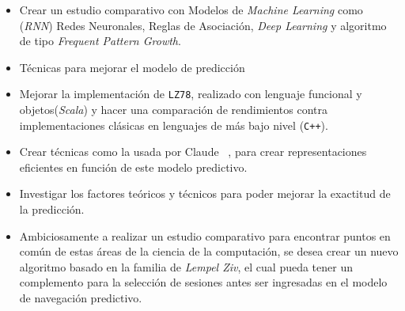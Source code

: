 \begin{itemize}

\item Crear un estudio comparativo con Modelos de \emph{Machine Learning} como (\emph{RNN}) Redes Neuronales, Reglas de Asociación, \emph{Deep Learning} y algoritmo de tipo \emph{Frequent Pattern Growth}.

\item Técnicas para mejorar el modelo de predicción 
\item Mejorar la implementación de \texttt{LZ78}, realizado con lenguaje funcional y objetos(\emph{Scala}) y hacer una comparación de rendimientos contra implementaciones clásicas en lenguajes de más bajo nivel (\texttt{C++}).


\item Crear técnicas como la usada por Claude \etal~\cite{Claude2014}, para crear representaciones eficientes en función de este modelo predictivo.


\item Investigar los factores teóricos y técnicos para poder mejorar la exactitud de la predicción.

\item Ambiciosamente a realizar un estudio comparativo para encontrar puntos en común de estas áreas de la ciencia de la computación, se desea crear un nuevo algoritmo basado en la familia de \emph{Lempel Ziv}, el cual pueda tener un complemento para la selección de sesiones antes ser ingresadas en el modelo de navegación predictivo. 


	
\end{itemize}	






 









